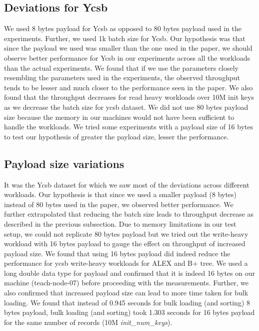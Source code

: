 \documentclass[12pt,a4paper]{article}
\begin{document}
\subsection{Deviations for Ycsb}
We used 8 bytes payload for Ycsb as opposed to 80 bytes payload used in the experiments. Further, we used 1k batch size for Ycsb. Our hypothesis was that since the payload we used was smaller than the one used in the paper, we should observe better performance for Ycsb in our experiments across all the workloads than the actual experiments. We found that if we use the parameters closely resembling the parameters used in the experiments, the observed throughput tends to be lesser and much closer to the performance seen in the paper. We also found that the throughput decreases for read heavy workloads over 10M init keys as we decrease the batch size for ycsb dataset. We did not use 80 bytes payload size because the memory in our machines would not have been sufficient to handle the workloads. We tried some experiments with a payload size of 16 bytes to test our hypothesis of greater the payload size, lesser the performance.

\subsection{Payload size variations}
It was the Ycsb dataset for which we saw most of the deviations across different workloads. Our hypothesis is that since we used a smaller payload (8 bytes) instead of 80 bytes used in the paper, we observed better performance. We further extrapolated that reducing the batch size leads to throughput decrease as described in the previous subsection. Due to memory limitations in our test setup, we could not replicate 80 bytes payload but we tried out the write-heavy workload with 16 bytes payload to gauge the effect on throughput of increased payload size. We found that using 16 bytes payload did indeed reduce the performance for ycsb write-heavy workloads for ALEX and B+ tree. We used a long double data type for payload and confirmed that it is indeed 16 bytes on our machine (teach-node-07) before proceeding with the measurements. Further, we also confirmed that increased payload size can lead to more time taken for bulk loading. We found that instead of 0.945 seconds for bulk loading (and sorting) 8 bytes payload, bulk loading (and sorting) took 1.303 seconds for 16 bytes payload for the same number of records (10M \emph{init\_num\_keys}).
\end{document}
